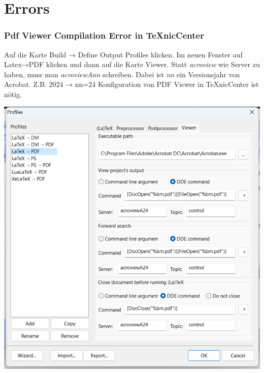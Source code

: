 \chapter{Errors}
\subsection{Pdf Viewer Compilation Error in TeXnicCenter}
Auf die Karte Build → Define Output Profiles klicken. Im neuen Fenster auf Latex→PDF klicken und dann auf die Karte Viewer. Statt \textit{acroview} wie Server zu haben, muss man \textit{acroviewAnn} schreiben. Dabei ist \textit{nn} ein Versionsjahr von Acrobat. Z.B. 2024 → nn=24 Konfiguration von PDF Viewer in TeXnicCenter ist nötig.  

\includegraphics[width=\linewidth]{LTX_Sources/texniccenter-pdf-config.png}